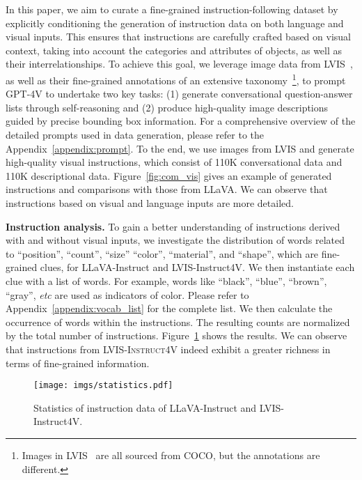 \documentclass{article}
\makeatletter
\newcommand{\fakeparagraph}[1]{\vspace{3mm}\noindent\textbf{#1}}
\newcommand{\dataname}{\textsc{LVIS-Instruct4V}\xspace}
\newcommand*{\etc}{\emph{etc}\@\xspace}
\makeatother
\begin{document}
In this paper, we aim to curate a fine-grained instruction-following dataset by explicitly conditioning the generation of instruction data on both language and visual inputs. This ensures that instructions are carefully crafted based on visual context, taking into account the categories and attributes of objects, as well as their interrelationships. To achieve this goal, we leverage image data from LVIS~\cite{gupta2019lvis}, as well as their fine-grained annotations of an extensive taxonomy~\footnote{Images in LVIS~\cite{gupta2019lvis} are all sourced from COCO, but the annotations are different.}, to prompt GPT-4V to undertake two key tasks: (1) generate conversational question-answer lists through self-reasoning and (2) produce high-quality image descriptions guided by precise bounding box information. For a comprehensive overview of the detailed prompts used in data generation, please refer to the Appendix~\ref{appendix:prompt}. To the end, we use  images from LVIS and generate  high-quality visual instructions, which consist of 110K conversational data and 110K descriptional data. Figure~\ref{fig:com_vis} gives an example of generated instructions and comparisons with those from LLaVA. We can observe that instructions based on visual and language inputs are more detailed.

\fakeparagraph{Instruction analysis.} To gain a better understanding of instructions derived with and without visual inputs, we investigate the distribution of words related to ``position'', ``count'', ``size'' ``color'', ``material'', and ``shape'', which are fine-grained clues, for LLaVA-Instruct and LVIS-Instruct4V. We then instantiate each clue with a list of words. For example, words like ``black'', ``blue'', ``brown'', ``gray'', \etc are used as indicators of color. Please refer to Appendix~\ref{appendix:vocab_list} for the complete list. We then
calculate the occurrence of words within the instructions. The resulting counts are normalized by the total number of instructions. Figure~\ref{fig:instruct_analysis} shows the results. We can observe that instructions from \dataname indeed exhibit a greater richness in terms of fine-grained information.



\begin{figure}[!h]
  \centering
  \texttt{[image: imgs/statistics.pdf]}
  \vspace{-0.1in}
  \caption{Statistics of instruction data of LLaVA-Instruct and  LVIS-Instruct4V.}
  \label{fig:instruct_analysis}
\end{figure}
\end{document}
